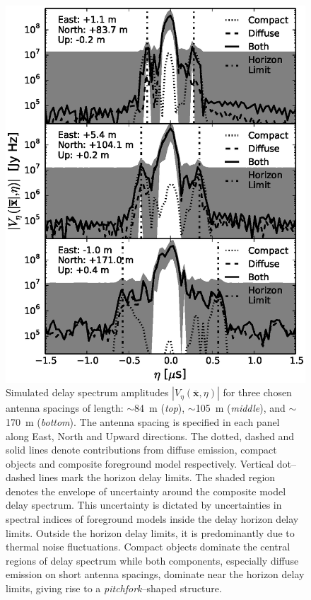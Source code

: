 \documentclass[preprint2,iop,numberedappendix]{emulateapj}
\begin{document}
\begin{figure}[htb]
\centering
\includegraphics[width=\linewidth]{figures/v1_0/delta_array_3_baseline_comparison_CLEAN_noiseless_visibilities_0.3m_ground_custom_gaussian_FG_model_all_sky_nside_64_Tsys_95.0K_185.0_MHz_30.7_MHz_bhw2.0.eps}
\caption{Simulated delay spectrum amplitudes $|V_\eta(\overline{\mathbf{x}},\eta)|$ for three chosen antenna spacings of length: $\sim$84~m ({\it top}), $\sim$105~m ({\it middle}), and $\sim$170~m ({\it bottom}). The antenna spacing is specified in each panel along East, North and Upward directions. The dotted, dashed and solid lines denote contributions from diffuse emission, compact objects and composite foreground model respectively. Vertical dot--dashed lines mark the horizon delay limits. The shaded region denotes the envelope of uncertainty around the composite model delay spectrum. This uncertainty is dictated by uncertainties in spectral indices of foreground models inside the delay horizon delay limits. Outside the horizon delay limits, it is predominantly due to thermal noise fluctuations. Compact objects dominate the central regions of delay spectrum while both components, especially diffuse emission on short antenna spacings, dominate near the horizon delay limits, giving rise to a {\it pitchfork}--shaped structure. \label{fig:pitchfork-baselines}}
\end{figure}
\end{document}
